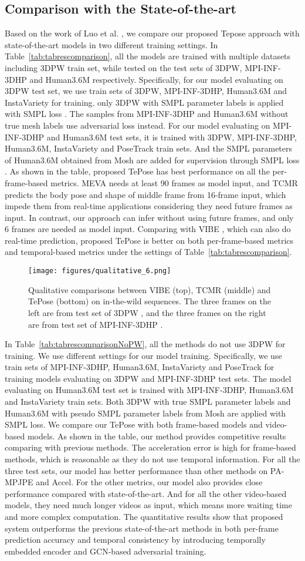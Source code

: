 \documentclass[10pt,twocolumn,letterpaper]{article}
\newcommand{\qual}{
\begin{figure*}[t]
  \centering
  \texttt{[image: figures/qualitative\_6.png]}
  \caption{Qualitative comparisons between VIBE \cite{kocabas2020vibe} (top), TCMR \cite{choi2021beyond} (middle) and TePose (bottom) on in-the-wild sequences. The three frames on the left are from test set of 3DPW \cite{von2018recovering}, and the three frames on the right are from test set of MPI-INF-3DHP \cite{mehta2017monocular}.}
  \label{fig:qual}
\end{figure*}
}
\newcommand{\tabref}[1]{Table~\ref{tab:#1}}
\begin{document}
\subsection{Comparison with the State-of-the-art}
Based on the work of Luo et al. \cite{luo20203d}, we compare our proposed Tepose approach with state-of-the-art models in two different training settings. In \tabref{tabrescomparison}, all the models are trained with multiple datasets including 3DPW train set, while tested on the test sets of 3DPW, MPI-INF-3DHP and Human3.6M respectively. Specifically, for our model evaluating on 3DPW test set, we use train sets of 3DPW, MPI-INF-3DHP, Human3.6M and InstaVariety for training. only 3DPW with SMPL parameter labels is applied with SMPL loss . The samples from MPI-INF-3DHP and Human3.6M without true mesh labels use adversarial loss  instead.
For our model evaluating on MPI-INF-3DHP and Human3.6M test sets, it is trained with 3DPW, MPI-INF-3DHP, Human3.6M, InstaVariety and PoseTrack train sets. And the SMPL parameters of Human3.6M obtained from Mosh \cite{loper2014mosh} are added for supervision through SMPL loss . As shown in the table, proposed TePose has best performance on all the per-frame-based metrics. MEVA \cite{luo20203d} needs at least 90 frames as model input, and TCMR \cite{choi2021beyond} predicts the body pose and shape of middle frame from 16-frame input, which impede them from real-time applications considering they need future frames as input. In contrast, our approach can infer without using future frames, and only 6 frames are needed as model input. Comparing with VIBE \cite{kocabas2020vibe}, which can also do real-time prediction, proposed TePose is better on both per-frame-based metrics and temporal-based metrics under the settings of \tabref{tabrescomparison}.


\qual


In \tabref{tabrescomparisonNoPW}, all the methods do not use 3DPW for training. We use different settings for our model training.  Specifically, we use train sets of MPI-INF-3DHP, Human3.6M, InstaVariety and PoseTrack for training models evaluating on 3DPW and MPI-INF-3DHP test sets. The model evaluating on Human3.6M test set is trained with MPI-INF-3DHP, Human3.6M and InstaVariety train sets. Both 3DPW with true SMPL parameter labels and Human3.6M with pseudo SMPL parameter labels from Mosh \cite{loper2014mosh} are applied with SMPL loss. We compare our TePose with both frame-based models and video-based models. As shown in the table, our method provides competitive results comparing with previous methods. The acceleration error is high for frame-based methods, which is reasonable as they do not use temporal information. For all the three test sets, our model has better performance than other methods on PA-MPJPE and Accel. For the other metrics, our model also provides close performance compared with state-of-the-art. And for all the other video-based models, they need much longer videos as input, which means more waiting time and more complex computation. The quantitative results show that proposed system outperforms the previous state-of-the-art methods in both per-frame prediction accuracy and temporal consistency by introducing temporally embedded encoder and GCN-based adversarial training.
\end{document}
